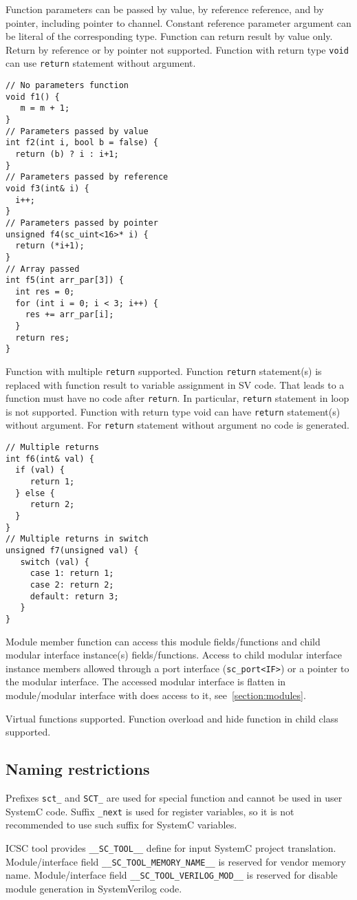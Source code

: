 Function parameters can be passed by value, by reference reference, and by pointer, including pointer to channel. Constant reference parameter argument can be literal of the corresponding type.
Function can return result by value only. Return by reference or by  pointer not supported. Function with return type {\tt void} can use {\tt return} statement without argument. 
%
\begin{lstlisting}[style=mycpp]
// No parameters function
void f1() {
   m = m + 1;
}       
// Parameters passed by value 
int f2(int i, bool b = false) {
  return (b) ? i : i+1;
}    
// Parameters passed by reference 
void f3(int& i) {
  i++;
}
// Parameters passed by pointer
unsigned f4(sc_uint<16>* i) {
  return (*i+1);
}
// Array passed 
int f5(int arr_par[3]) {
  int res = 0;
  for (int i = 0; i < 3; i++) {
    res += arr_par[i];
  }
  return res;
}
\end{lstlisting}

Function with multiple {\tt return} supported. Function {\tt return} statement(s) is replaced with function result to variable assignment in SV code.  That leads to a function must have no code after {\tt return}. In particular, {\tt return} statement in loop is not supported.  Function with return type void can have {\tt return} statement(s) without argument. For {\tt return} statement without argument no code is generated.
%
\begin{lstlisting}[style=mycpp]
// Multiple returns
int f6(int& val) {
  if (val) {
     return 1;
  } else {
     return 2;
  }
}
// Multiple returns in switch
unsigned f7(unsigned val) {
   switch (val) {
     case 1: return 1;
     case 2: return 2;
     default: return 3;
   }
}
\end{lstlisting}

Module member function can access this module fields/functions and child modular interface instance(s) fields/functions. Access to child modular interface instance members allowed through a port interface ({\tt sc\_port<IF>}) or a pointer to the modular interface. The accessed modular interface is flatten in module/modular interface with does access to it, see~\ref{section:modules}.

Virtual functions supported. Function overload and hide function in child class supported.


\subsection{Naming restrictions}

Prefixes {\tt sct\_} and {\tt SCT\_} are used for special function and cannot be used in user SystemC code.
Suffix {\tt \_next} is used for register variables, so it is not recommended to use such suffix for SystemC variables.

ICSC tool provides {\tt \_\_SC\_TOOL\_\_} define for input SystemC project translation. 
Module/interface field {\tt\_\_SC\_TOOL\_MEMORY\_NAME\_\_} is reserved for vendor memory name. 
Module/interface field {\tt \_\_SC\_TOOL\_VERILOG\_MOD\_\_} is reserved for disable module generation in SystemVerilog code. 

